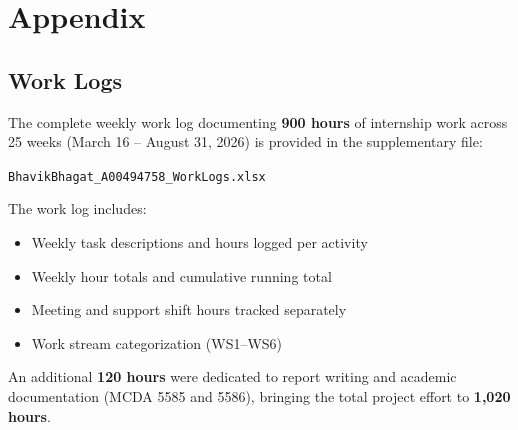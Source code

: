 \clearpage
\chapter{Appendix}
\label{chap:appendix}

\section{Work Logs}
\label{sec:appendix_worklogs}

The complete weekly work log documenting \textbf{900 hours} of internship work
across 25 weeks (March 16 -- August 31, 2026) is provided in the supplementary file:

\begin{center}
\texttt{BhavikBhagat\_A00494758\_WorkLogs.xlsx}
\end{center}

\noindent The work log includes:
\begin{itemize}
    \item Weekly task descriptions and hours logged per activity
    \item Weekly hour totals and cumulative running total
    \item Meeting and support shift hours tracked separately
    \item Work stream categorization (WS1--WS6)
\end{itemize}

\noindent An additional \textbf{120 hours} were dedicated to report writing and academic documentation
(MCDA 5585 and 5586), bringing the total project effort to \textbf{1,020 hours}.

\nocite{*}

